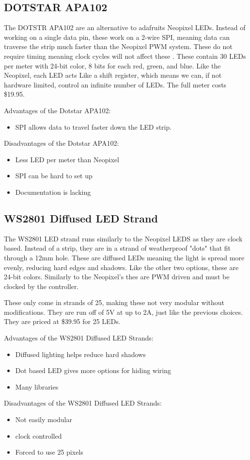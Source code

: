 \documentclass[onecolumn, draftclsnofoot,10pt, compsoc]{IEEEtran}
\begin{document}
		\subsection{DOTSTAR APA102}
		\noindent The DOTSTR APA102 are an alternative to adafruits Neopixel LEDs. Instead
		of working on a single data pin, these work on a 2-wire SPI, meaning data
		can traverse the strip much faster than the Neopixel PWM system. These do
		not require timing meaning clock cycles will not affect these
		\cite[Pg2]{dotstar}. These contain 30 LEDs per meter with 24-bit color,
		8 bits for each red, green, and blue. Like the Neopixel, each LED acts Like
		a shift register, which means we can, if not hardware limited, control an
		infinite number of LEDs. The full meter costs \$19.95.

		\vspace{5mm}
		\noindent Advantages of the Dotstar APA102:
		\begin{itemize}
			\item SPI allows data to travel faster down the LED strip.
		\end{itemize}
		Disadvantages of the Dotstar APA102:
		\begin{itemize}
			\item Less LED per meter than Neopixel
			\item SPI can be hard to set up
			\item Documentation is lacking
		\end{itemize}
		\subsection{WS2801 Diffused LED Strand}
		\noindent The WS2801 LED strand runs similarly to the Neopixel LEDS as they
		are clock based. Instead of a strip, they are in a strand of weatherproof
		"dots" that fit through a 12mm hole\cite[Pg 7]{strand}. These are diffused
		LEDs meaning the light is spread more evenly, reducing hard edges and
		shadows. Like the other two options, these are 24-bit colors. Similarly to
		the Neopixel's thes are PWM driven and must be clocked by the controller.

		\vspace{5mm}
		\noindent These only come in strands of 25, making these not very modular without
		modifications. They are run off of 5V at up to 2A, just like the previous
		choices. They are priced at \$39.95 for 25 LEDs.

		\vspace{5mm}
		\noindent Advantages of the WS2801 Diffused LED Strands:
		\begin{itemize}
			\item Diffused lighting helps reduce hard shadows
			\item Dot based LED gives more options for hiding wiring
			\item Many libraries
		\end{itemize}
		Disadvantages of the WS2801 Diffused LED Strands:
		\begin{itemize}
			\item Not easily modular
			\item clock controlled
			\item Forced to use 25 pixels
		\end{itemize}
\end{document}
